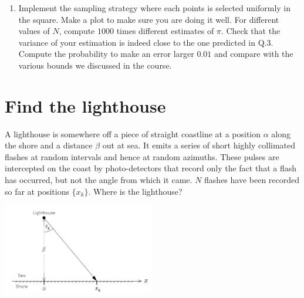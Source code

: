 \documentclass[11pt]{article}
\begin{document}
\begin{enumerate}
\item Implement the  sampling strategy where each points is selected uniformly in the square. Make a plot to make sure you are doing it well. For different values of $N$, compute $1000$ times different estimates of $\pi$. Check that the variance of your estimation is indeed close to the one predicted in Q.3. Compute the probability to make an error larger $0.01$ and compare with the various bounds we discussed in the course. 
\end{enumerate}
%

\section{Find the lighthouse}

A lighthouse is somewhere off a piece of straight coastline at a position $\alpha$ along the shore and a distance $\beta$ out at sea. It emits a series of short highly collimated flashes at random intervals and hence at random azimuths. These pulses are intercepted on the coast by photo-detectors that record only the fact that a flash has occurred, but not the angle from which it came. $N$ flashes have been recorded so far at positions $\{x_k\}$. Where is the lighthouse?

 \includegraphics[width=0.5\textwidth]{download}
\end{document}

